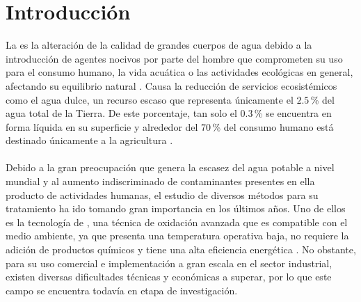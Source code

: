 


    \section{Introducción}
La  es la alteración de la calidad de grandes cuerpos de agua debido a la introducción de agentes nocivos por parte del hombre que comprometen su uso para el consumo humano, la vida acuática o las actividades ecológicas en general, afectando su equilibrio natural . Causa la reducción de servicios ecosistémicos como el agua dulce, un recurso escaso que representa únicamente el $2.5\,$\% del agua total de la Tierra. De este porcentaje, tan solo el $0.3\,$\% se encuentra en forma líquida en su superficie  y alrededor del $70\,$\% del consumo humano está destinado únicamente a la agricultura . \\\\
Debido a la gran preocupación que genera la escasez del agua potable a nivel mundial y al aumento indiscriminado de contaminantes presentes en ella producto de actividades humanas, el estudio de diversos métodos para su tratamiento ha ido tomando gran importancia en los últimos años. Uno de ellos es la tecnología de , una técnica de oxidación avanzada que es compatible con el medio ambiente, ya que presenta una temperatura operativa baja, no requiere la adición de productos químicos y tiene una alta eficiencia energética . No obstante, para su uso comercial e implementación a gran escala en el sector industrial, existen diversas dificultades técnicas y económicas a superar, por lo que este campo se encuentra todavía en etapa de investigación. \\\\
